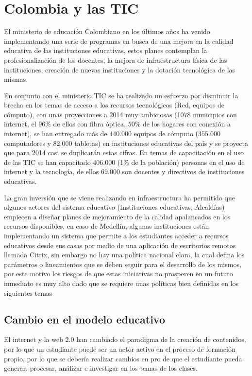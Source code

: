 \documentclass[conference]{IEEEtran}
\begin{document}
\section{Colombia y las TIC}
El ministerio de educación Colombiano en los últimos años ha venido implementando una serie de programas en busca de una mejora en la calidad educativa de las instituciones educativas, estos planes contemplan la profesionalización de los docentes, la mejora de infraestructura física de las instituciones, creación de nuevas instituciones y la dotación tecnológica de las mismas.

En conjunto con el ministerio TIC se ha realizado un esfuerzo por disminuir la brecha en los temas de acceso a los recursos tecnológicos (Red, equipos de cómputo), con unas proyecciones a 2014 muy ambiciosas (1078 municipios con internet, el 96\% de ellos con fibra óptica, 50\% de los hogares con conexión a internet)\cite{mintic:red}, se han entregado más de 440.000 equipos de cómputo (355.000 computadores y 82.000 tabletas)\cite{mintic:hard} en instituciones educativas del país y se proyecta que para 2014 casi se duplicarán estas cifras. En temas de capacitación en el uso de las TIC se han capacitado 406.000 (1\% de la población) personas en el uso de internet  y la tecnología, de ellos 69.000 son docentes y directivos de instituciones educativas\cite{mintic:usuarios}.

La gran inversión que se viene realizando en infraestructura ha permitido que algunos actores del sistema educativo (Instituciones educativas, Alcaldías) empiecen a diseñar planes de mejoramiento de la calidad apalancados en los recursos disponibles, en caso de Medellín, algunas instituciones están implementando un sistema que permite a los estudiantes acceder a recursos educativos desde sus casas por medio de una aplicación de escritorios remotos llamada Citrix\cite{citrix}, sin embargo no hay una política nacional clara, la cual defina los parámetros o lineamientos que se deben seguir para el desarrollo de los mismos, por este motivo los riesgos de que estas iniciativas no prosperen en un futuro inmediato es muy alto dado que se requiere unas políticas bien definidas en los siguientes temas
\subsection{Cambio en el modelo educativo} 
El internet y la web 2.0 han cambiado el paradigma de la creación de contenidos, por lo que un estudiante puede ser un actor activo en el proceso de formación propio, por lo que se debería realizar cambios en pro de que el estudiante pueda generar, procesar, análizar e investigar en los temas de los clases. 
\end{document}
